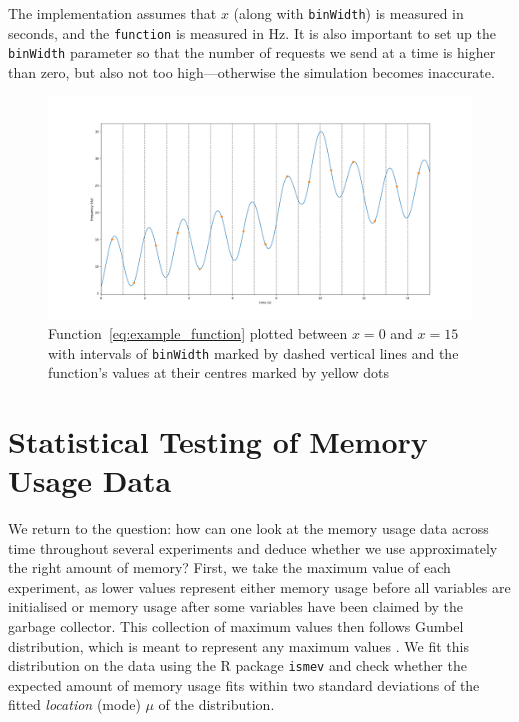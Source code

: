 \documentclass{article}
\begin{document}
The implementation assumes that $x$ (along with \texttt{binWidth}) is measured
in seconds, and the \texttt{function} is measured in \si{\hertz}. It is also
important to set up the \texttt{binWidth} parameter so that the number of
requests we send at a time is higher than zero, but also not too
high---otherwise the simulation becomes inaccurate.

\begin{figure}
  \centering
  \includegraphics[width=\textwidth]{../plots/functional_workload.png}
  \caption{Function~\eqref{eq:example_function} plotted between $x=0$ and
    $x=15$ with intervals of \texttt{binWidth} marked by dashed vertical lines
    and the function's values at their centres marked by yellow dots}
  \label{fig:functional_workload}
\end{figure}

\section{Statistical Testing of Memory Usage Data}


We return to the question: how can one look at the memory usage data across time
throughout several experiments and deduce whether we use approximately the right
amount of memory? First, we take the maximum value of each experiment, as lower
values represent either memory usage before all variables are initialised or
memory usage after some variables have been claimed by the garbage collector.
This collection of maximum values then follows Gumbel distribution, which
is meant to represent any maximum values \cite{gumbel1935valeurs}. We fit this
distribution on the data using the R package \texttt{ismev}
\cite{heffernan2012ismev} and check whether the expected amount of memory usage
fits within two standard deviations of the fitted \emph{location} (mode) $\mu$
of the distribution.
\end{document}
